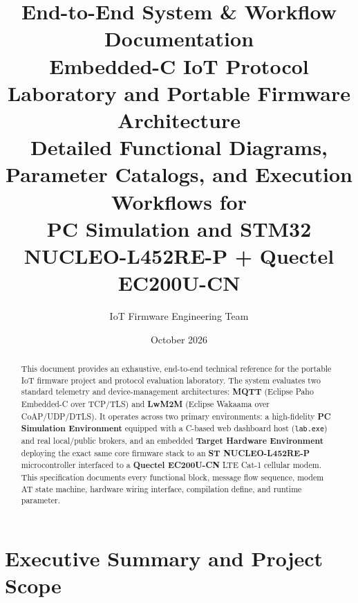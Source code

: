 \documentclass[11pt,a4paper]{article}
\title{\textbf{End-to-End System \& Workflow Documentation}\\[6pt]
\Large Embedded-C IoT Protocol Laboratory and Portable Firmware Architecture\\
\large Detailed Functional Diagrams, Parameter Catalogs, and Execution Workflows for\\
PC Simulation and STM32 NUCLEO-L452RE-P + Quectel EC200U-CN}
\author{IoT Firmware Engineering Team}
\date{October 2026}
\newcommand{\code}[1]{\texttt{#1}}
\begin{document}
\maketitle

\begin{abstract}
This document provides an exhaustive, end-to-end technical reference for the portable IoT firmware project and protocol evaluation laboratory. The system evaluates two standard telemetry and device-management architectures: \textbf{MQTT} (Eclipse Paho Embedded-C over TCP/TLS) and \textbf{LwM2M} (Eclipse Wakaama over CoAP/UDP/DTLS). It operates across two primary environments: a high-fidelity \textbf{PC Simulation Environment} equipped with a C-based web dashboard host (\code{lab.exe}) and real local/public brokers, and an embedded \textbf{Target Hardware Environment} deploying the exact same core firmware stack to an \textbf{ST NUCLEO-L452RE-P} microcontroller interfaced to a \textbf{Quectel EC200U-CN} LTE Cat-1 cellular modem. This specification documents every functional block, message flow sequence, modem AT state machine, hardware wiring interface, compilation define, and runtime parameter.
\end{abstract}

\tableofcontents
\newpage

\section{Executive Summary and Project Scope}
\end{document}
